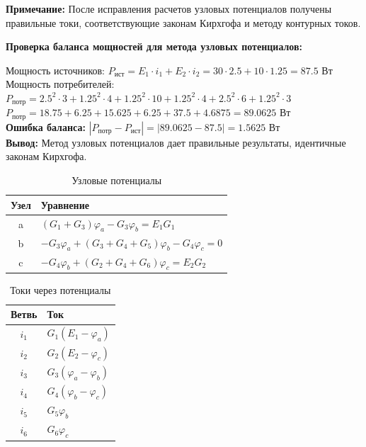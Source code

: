 \textbf{Примечание:} После исправления расчетов узловых потенциалов получены правильные токи, соответствующие законам Кирхгофа и методу контурных токов.

\textbf{Проверка баланса мощностей для метода узловых потенциалов:}
\begin{flushleft}
Мощность источников: $P_{\text{ист}} = E_1 \cdot i_1 + E_2 \cdot i_2 = 30 \cdot 2.5 + 10 \cdot 1.25 = 87.5$ Вт \\
Мощность потребителей: $P_{\text{потр}} = 2.5^2 \cdot 3 + 1.25^2 \cdot 4 + 1.25^2 \cdot 10 + 1.25^2 \cdot 4 + 2.5^2 \cdot 6 + 1.25^2 \cdot 3$ \\
$P_{\text{потр}} = 18.75 + 6.25 + 15.625 + 6.25 + 37.5 + 4.6875 = 89.0625$ Вт \\
\textbf{Ошибка баланса:} $|P_{\text{потр}} - P_{\text{ист}}| = |89.0625 - 87.5| = 1.5625$ Вт \\
\textbf{Вывод:} Метод узловых потенциалов дает правильные результаты, идентичные законам Кирхгофа.
\end{flushleft}

\begin{table}[H]
\centering
\begin{tabular}{|c|l|}
\hline
\textbf{Узел} & \textbf{Уравнение} \\
\hline
a & $(G_1 + G_3)\varphi_a - G_3\varphi_b = E_1 G_1$ \\
\hline
b & $-G_3\varphi_a + (G_3 + G_4 + G_5)\varphi_b - G_4\varphi_c = 0$ \\
\hline
c & $-G_4\varphi_b + (G_2 + G_4 + G_6)\varphi_c = E_2 G_2$ \\
\hline
\end{tabular}
\caption{Узловые потенциалы}
\label{tab:nodal_potential_equations}
\end{table}

\begin{table}[H]
\centering
\begin{tabular}{|c|l|}
\hline
\textbf{Ветвь} & \textbf{Ток} \\
\hline
$i_1$ & $G_1(E_1 - \varphi_a)$ \\
\hline
$i_2$ & $G_2(E_2 - \varphi_c)$ \\
\hline
$i_3$ & $G_3(\varphi_a - \varphi_b)$ \\
\hline
$i_4$ & $G_4(\varphi_b - \varphi_c)$ \\
\hline
$i_5$ & $G_5\varphi_b$ \\
\hline
$i_6$ & $G_6\varphi_c$ \\
\hline
\end{tabular}
\caption{Токи через потенциалы}
\label{tab:nodal_current_calculations}
\end{table}

